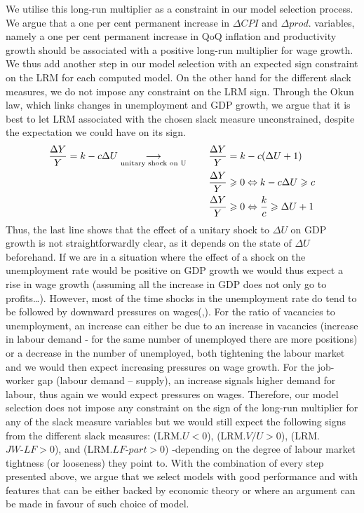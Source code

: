 We utilise this long-run multiplier as a constraint in our model selection process.
We argue that a one per cent permanent increase in $\Delta CPI$ and $\Delta prod.$ variables, namely a one per cent permanent increase in QoQ inflation and productivity growth should be associated with a positive long-run multiplier for wage growth. 
We thus add another step in our model selection with an expected sign constraint on the LRM for each computed model. 
On the other hand for the different slack measures, we do not impose any constraint on the LRM sign. 
Through the Okun law, which links changes in unemployment and GDP growth, we argue that it is best to let LRM associated with the chosen slack measure unconstrained, despite the expectation we could have on its sign.
\vspace{-0.0005cm}
\begin{align*}
    \frac{\Delta Y}{Y} = k - c\Delta U \underset{\textrm{unitary shock on U}}{\longrightarrow} \hspace*{0.7cm} \frac{\Delta Y}{Y} &= k - c(\Delta U + 1)\\
    \frac{\Delta Y}{Y} &\geqslant 0 \Leftrightarrow k - c\Delta U \geqslant c\\
    \frac{\Delta Y}{Y} &\geqslant 0 \Leftrightarrow \frac{k}{c} \geqslant \Delta U +1\\
\end{align*}
\quad Thus, the last line shows that the effect of a unitary shock to $\Delta U$ on GDP growth is not straightforwardly clear, as it depends on the state of $\Delta U$ beforehand. 
If we are in a situation where the effect of a shock on the unemployment rate would be positive on GDP growth we would thus expect a rise in wage growth (assuming all the increase in GDP does not only go to profits…). 
However, most of the time shocks in the unemployment rate do tend to be followed by downward pressures on wages(\cite{labour2},\cite{labour9}). 
For the ratio of vacancies to unemployment, an increase can either be due to an increase in vacancies (increase in labour demand - for the same number of unemployed there are more positions) or a decrease in the number of unemployed, both tightening the labour market and we would then expect increasing pressures on wage growth. 
For the job-worker gap (labour demand – supply), an increase signals higher demand for labour, thus again we would expect pressures on wages. 
Therefore, our model selection does not impose any constraint on the sign of the long-run multiplier for any of the slack measure variables but we would still expect the following signs from the different slack measures: (LRM.$U<0$), (LRM.$V/U>0$), (LRM.$JW\textrm{-}LF>0$), and (LRM.$LF\textrm{-}part>0$) -depending on the degree of labour market tightness (or looseness) they point to. 
With the combination of every step presented above, we argue that we select models with good performance and with features that can be either backed by economic theory or where an argument can be made in favour of such choice of model.

